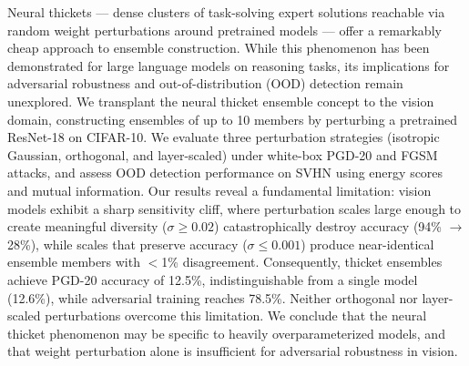 Neural thickets --- dense clusters of task-solving expert solutions reachable via random weight perturbations around pretrained models --- offer a remarkably cheap approach to ensemble construction. While this phenomenon has been demonstrated for large language models on reasoning tasks, its implications for adversarial robustness and out-of-distribution (OOD) detection remain unexplored. We transplant the neural thicket ensemble concept to the vision domain, constructing ensembles of up to 10 members by perturbing a pretrained ResNet-18 on CIFAR-10. We evaluate three perturbation strategies (isotropic Gaussian, orthogonal, and layer-scaled) under white-box PGD-20 and FGSM attacks, and assess OOD detection performance on SVHN using energy scores and mutual information. Our results reveal a fundamental limitation: vision models exhibit a sharp sensitivity cliff, where perturbation scales large enough to create meaningful diversity ($\sigma \geq 0.02$) catastrophically destroy accuracy (94\% $\to$ 28\%), while scales that preserve accuracy ($\sigma \leq 0.001$) produce near-identical ensemble members with $<$1\% disagreement. Consequently, thicket ensembles achieve PGD-20 accuracy of 12.5\%, indistinguishable from a single model (12.6\%), while adversarial training reaches 78.5\%. Neither orthogonal nor layer-scaled perturbations overcome this limitation. We conclude that the neural thicket phenomenon may be specific to heavily overparameterized models, and that weight perturbation alone is insufficient for adversarial robustness in vision.
